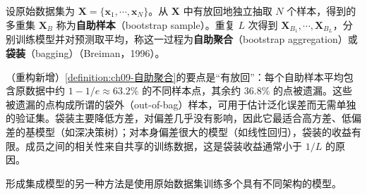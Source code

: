 \documentclass[../../main.tex]{subfiles}
\begin{document}
\begin{definition}[自助聚合与袋装]\label{definition:ch09-自助聚合}
设原始数据集为 $\boldsymbol{X}=\{\boldsymbol{x}_{1},\cdots,\boldsymbol{x}_{N}\}$。从 $\boldsymbol{X}$ 中有放回地独立抽取 $N$ 个样本，得到的多重集 $\boldsymbol{X}_{B}$ 称为\textbf{自助样本}（bootstrap sample）。重复 $L$ 次得到 $\boldsymbol{X}_{B_{1}},\cdots,\boldsymbol{X}_{B_{L}}$，分别训练模型并对预测取平均，称这一过程为\textbf{自助聚合}（bootstrap aggregation）或\textbf{袋装}（bagging）（Breiman，1996）。
\end{definition}

\begin{remark}（重构新增）\cref{definition:ch09-自助聚合}的要点是“有放回”：每个自助样本平均包含原数据中约 $1-1/e\approx63.2\%$ 的不同样本点，其余约 $36.8\%$ 的点被遗漏。这些被遗漏的点构成所谓的袋外（out-of-bag）样本，可用于估计泛化误差而无需单独的验证集。袋装主要降低方差，对偏差几乎没有影响，因此它最适合高方差、低偏差的基模型（如深决策树）；对本身偏差很大的模型（如线性回归），袋装的收益有限。成员之间的相关性来自共享的训练数据，这是袋装收益通常小于 $1/L$ 的原因。
\end{remark}

形成集成模型的另一种方法是使用原始数据集训练多个具有不同架构的模型。
\end{document}
